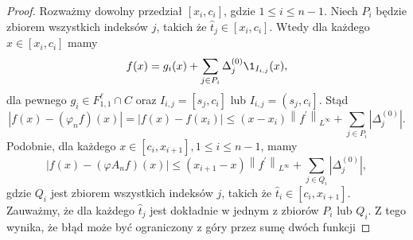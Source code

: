 \documentclass[oik, pdftex, robocza, man]{mgrwms}
\begin{document}
    \begin{proof}
        Rozważmy dowolny przedział $[x_{i}, c_{i}]$, gdzie $1 \leq i \leq n - 1$. Niech $P_{i}$ będzie zbiorem wszystkich indeksów $j$, takich że $\hat{t}_{j} \in [x_{i}, c_{i}]$. Wtedy dla każdego $x \in [x_{i}, c_{i}]$ mamy
        \begin{equation*}
            f(x)=g_{i}(x)+\sum_{j \in P_{i}} \Delta_{j}^{(0)} \1_{I_{i, j}}(x),
        \end{equation*}
        dla pewnego $g_{i} \in F_{1,1}^{\ell} \cap C$ oraz $I_{i, j}=\left[s_{j}, c_{i}\right]$ lub $I_{i, j}=\left(s_{j}, c_{i}\right]$.
        Stąd
        \begin{equation*}
            \left|f(x)-\left(\varphi_{n}f\right)(x)\right|=\left|f(x)-f\left(x_{i}\right)\right| \leq\left(x-x_{i}\right)\left\|f^{\prime}\right\|_{L^{\infty}}+\sum_{j \in P_{i}}\left|\Delta_{j}^{(0)}\right|.
        \end{equation*}
        Podobnie, dla każdego $x \in\left[c_{i}, x_{i+1}\right], 1 \leq i \leq n-1$, mamy
        \begin{equation*}
            \left|f(x)-\left(\varphi{A}_{n}f\right)(x)\right| \leq\left(x_{i+1}-x\right)\left\|f^{\prime}\right\|_{L^{\infty}}+\sum_{j \in Q_{i}}\left|\Delta_{j}^{(0)}\right|,
        \end{equation*}
        gdzie $Q_{i}$ jest zbiorem wszystkich indeksów $j$, takich że $\hat{t}_{i} \in [c_{i}, x_{i+1}]$. Zauważmy, że dla każdego $\hat{t}_{j}$ jest dokładnie w jednym z zbiorów $P_{i}$ lub $Q_{i}$. Z tego wynika, że błąd może być ograniczony z góry przez sumę dwóch funkcji


\end{proof}
\end{document}
